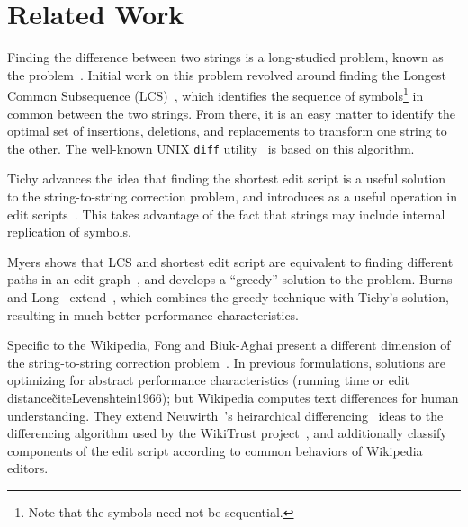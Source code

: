 \section{Related Work}

Finding the difference between two strings is a long-studied problem,
known as the  problem~\cite{Wagner1974}.
Initial work on this problem revolved around finding the
Longest Common Subsequence (LCS)~\cite{Gusfield1999}, which identifies the
sequence of symbols\footnote{Note that the symbols need not be sequential.}
in common between the two strings.
From there, it is an easy matter to identify the optimal
set of insertions, deletions, and replacements to transform
one string to the other.
The well-known UNIX \texttt{diff} utility~\cite{Hunt1976} is based
on this algorithm.

Tichy advances the idea that finding the shortest edit script is a
useful solution to the string-to-string correction problem, and
introduces  as a useful operation in edit
scripts~\cite{Tichy1984}.
This takes advantage of the fact that strings may include internal
replication of symbols.

Myers shows that LCS and shortest edit script are equivalent to finding
different paths in an edit graph~\cite{Myers1986}, and develops a
``greedy'' solution to the problem.
Burns and Long~\cite{Burns1997} extend~\cite{Reichenberger1991},
which combines the greedy technique with Tichy's solution,
resulting in much better performance characteristics.

Specific to the Wikipedia, Fong and Biuk-Aghai present a different
dimension of the string-to-string correction problem~\cite{Fong2010}.
In previous formulations, solutions are optimizing for abstract
performance characteristics (\eg running time or
edit distance\~cite{Levenshtein1966}); but Wikipedia computes text differences
for human understanding.
They extend Neuwirth~\etal's heirarchical differencing~\cite{Neuwirth1992}
ideas to the differencing algorithm used by the
WikiTrust project~\cite{www07}, and additionally classify components
of the edit script according to common behaviors of Wikipedia editors.

